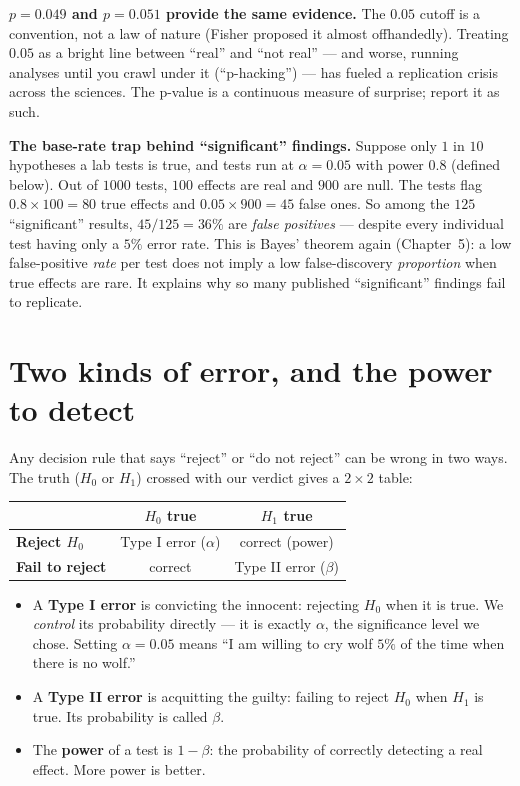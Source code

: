 \begin{trapbox}
\textbf{$p = 0.049$ and $p = 0.051$ provide the same evidence.} The $0.05$
cutoff is a convention, not a law of nature (Fisher proposed it almost offhandedly).
Treating $0.05$ as a bright line between ``real'' and ``not real'' --- and worse,
running analyses until you crawl under it (``p-hacking'') --- has fueled a replication
crisis across the sciences. The p-value is a continuous measure of surprise; report it
as such.
\end{trapbox}

\begin{paradoxbox}
\textbf{The base-rate trap behind ``significant'' findings.} Suppose only $1$ in $10$
hypotheses a lab tests is true, and tests run at $\alpha=0.05$ with power
$0.8$ (defined below). Out of $1000$ tests, $100$ effects are real and $900$ are null.
The tests flag $0.8\times 100 = 80$ true effects and $0.05\times 900 = 45$ false ones.
So among the $125$ ``significant'' results, $45/125 = 36\%$ are \emph{false positives}
--- despite every individual test having only a $5\%$ error rate. This is Bayes' theorem
again (Chapter~5): a low false-positive \emph{rate} per test does not imply a low
false-discovery \emph{proportion} when true effects are rare. It explains why so many
published ``significant'' findings fail to replicate.
\end{paradoxbox}

\section{Two kinds of error, and the power to detect}
\label{ch32:errors}

Any decision rule that says ``reject'' or ``do not reject'' can be wrong in two ways.
The truth ($H_0$ or $H_1$) crossed with our verdict gives a $2\times 2$ table:

\begin{center}
\renewcommand{\arraystretch}{1.4}
\begin{tabular}{l|cc}
 & \textbf{$H_0$ true} & \textbf{$H_1$ true} \\ \hline
\textbf{Reject $H_0$} & Type I error ($\alpha$) & correct (power) \\
\textbf{Fail to reject} & correct & Type II error ($\beta$) \\
\end{tabular}
\end{center}

\begin{itemize}
  \item A \textbf{Type I error} is convicting the innocent: rejecting $H_0$ when it is
  true. We \emph{control} its probability directly --- it is exactly $\alpha$, the
  significance level we chose. Setting $\alpha=0.05$ means ``I am willing to cry wolf
  $5\%$ of the time when there is no wolf.''
  \item A \textbf{Type II error} is acquitting the guilty: failing to reject $H_0$ when
  $H_1$ is true. Its probability is called $\beta$.
  \item The \textbf{power} of a test is $1-\beta$: the probability of correctly detecting
  a real effect. More power is better.
\end{itemize}

